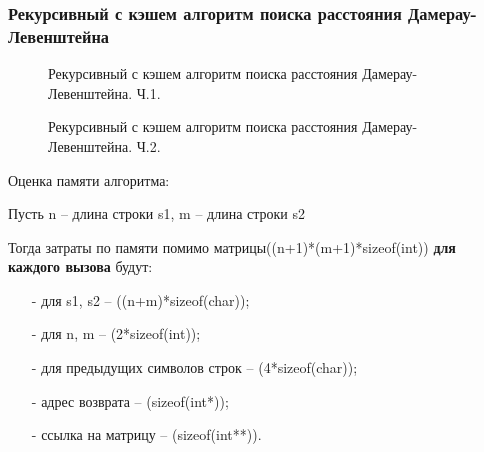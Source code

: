 \subsubsection{Рекурсивный с кэшем алгоритм поиска \newline расстояния Дамерау-Левенштейна}
\begin{figure}[!h]
	\centering
	\captionsetup{justification=centering}
	
	\caption{Рекурсивный с кэшем алгоритм поиска расстояния Дамерау-Левенштейна. Ч.1.}
	\label{fig:d41}
\end{figure}
\begin{figure}[h]
	\centering
	\captionsetup{justification=centering}
	
	\caption{Рекурсивный с кэшем алгоритм поиска \newline расстояния Дамерау-Левенштейна. Ч.2.}
	\label{fig:d42}
\end{figure}
\pagebreak
Оценка памяти алгоритма:\par
Пусть n -- длина строки s1, m -- длина строки s2\par
Тогда затраты по памяти помимо матрицы((n+1)*(m+1)*sizeof(int)) \textbf{для каждого вызова} будут:\par
\begin{itemize}
	\item[-] для s1, s2 -- ((n+m)*sizeof(char));
	\item[-] для n, m -- (2*sizeof(int));
	\item[-] для предыдущих символов строк -- (4*sizeof(char));
	\item[-] адрес возврата -- (sizeof(int*));
	\item[-] ссылка на матрицу -- (sizeof(int**)).
\end{itemize}
\pagebreak
